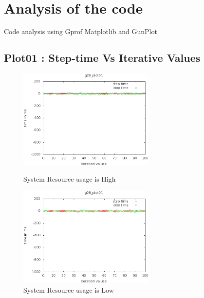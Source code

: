 \documentclass[a4paper,11pt]{article}
\begin{document}
\section{Analysis of the code}
Code analysis using Gprof Matplotlib and GunPlot
\subsection{Plot01 : Step-time Vs Iterative Values}
 	\begin{figure}[ht]
	\begin{minipage}[ht]{0.5\linewidth}
	\includegraphics[height=50mm]{plots/g28_plot01.eps}
	\caption{System Resource usage is High }	
	\label{fig:ResourceIntensivePlot01}
	\end{minipage}	
	\begin{minipage}[ht]{0.5\linewidth}
	\includegraphics[height=50mm]{plots1/g28_plot01.eps}
	\caption{System Resource usage is Low }
	\label{fig:ResourceIntensivePlot01a}
	\end{minipage}	
	\end{figure}
\end{document}
